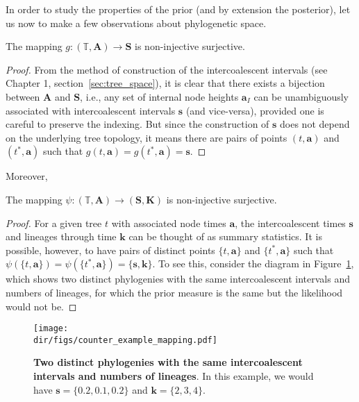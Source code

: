 In order to study the properties of the prior (and by extension the posterior), let us now to make a few observations about phylogenetic space.
\begin{remark}
\label{rmk:TBtoS}
 The mapping $g: (\mathbb{T}, \boldsymbol A) \to \boldsymbol S$ is non-injective surjective.
\end{remark}
\begin{proof}
From the method of construction of the intercoalescent intervals (see Chapter 1, section~\ref{sec:tree_space}), it is clear that there exists a bijection between $\boldsymbol A$ and $\boldsymbol S$, i.e., any set of internal node heights $\boldsymbol a_I$ can be unambiguously associated with intercoalescent intervals $\boldsymbol s$ (and vice-versa), provided one is careful to preserve the indexing.
But since the construction of $\boldsymbol s$ does not depend on the underlying tree topology, it means there are pairs of points $(t, \boldsymbol a)$ and $(t^\ast, \boldsymbol a)$ such that $g( t, \boldsymbol a) = g(t^\ast, \boldsymbol a) = \boldsymbol s$.
\end{proof}
Moreover,
\begin{remark}
\label{rmk:InvarCoal}
  The mapping $\psi : (\mathbb{T}, \boldsymbol A) \to (\boldsymbol S, \boldsymbol K)$ is non-injective surjective.
\end{remark}
\begin{proof}
 For a given tree  $t$ with associated node times $\boldsymbol a$, the intercoalescent times $\boldsymbol s$ and lineages through time $\boldsymbol k$ can be thought of as summary statistics.
It is possible, however, to have pairs of distinct points $\{t, \boldsymbol a\}$ and $\{t^\ast, \boldsymbol a\}$ such that $\psi( \{t, \boldsymbol a\}) = \psi(\{t^\ast, \boldsymbol a\}) = \{\boldsymbol s, \boldsymbol k\}$.
To see this, consider the diagram in Figure~\ref{fig:cexample}, which shows two distinct phylogenies with the same intercoalescent intervals and numbers of lineages, for which the prior measure is the same but the likelihood would not be.%
\end{proof}
\begin{figure}[!ht]
  \centering
  \texttt{[image: \\dir/figs/counter\_example\_mapping.pdf]}
\caption[Two distinct phylogenies with the same intercoalescent intervals and numbers of lineages.]{\textbf{Two distinct phylogenies with the same intercoalescent intervals and numbers of lineages}.
In this example, we would have $\boldsymbol s = \{0.2, 0.1, 0.2\}$ and $\boldsymbol k = \{2, 3, 4\}$.
}
\label{fig:cexample}
\end{figure}


